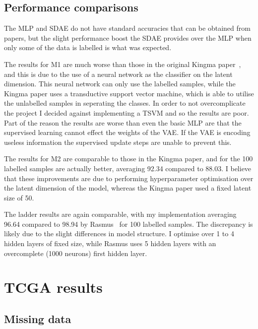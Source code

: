 \subsection{Performance comparisons}

The MLP and SDAE do not have standard accuracies that can be obtained from papers, but the slight performance boost the SDAE provides 
over the MLP when only some of the data is labelled is what was expected.

The results for M1 are much worse than those in the original Kingma paper~\cite{DBLP:journals/corr/KingmaRMW14}, and this is due to the use
of a neural network as the classifier on the latent dimension. This neural network can only use the labelled samples, while the Kingma 
paper uses a transductive support vector machine, which is able to utilise the unlabelled samples in seperating the classes. In order to
not overcomplicate the project I decided against implementing a TSVM and so the results are poor. Part of the reason the results are worse 
than even the basic MLP are that the supervised learning cannot effect the weights of the VAE. If the VAE is encoding useless information 
the supervised update steps are unable to prevent this.

The results for M2 are comparable to those in the Kingma paper, and for the 100 labelled samples are actually better, averaging 92.34 
compared to 88.03. I believe that these improvements are due to performing hyperparameter optimisation over the latent dimension of the 
model, whereas the Kingma paper used a fixed latent size of 50.

The ladder results are again comparable, with my implementation averaging 96.64 compared to 98.94 by Rasmus~\cite{DBLP:journals/corr/RasmusVHBR15}
for 100 labelled samples.
The discrepancy is likely due to the slight differences in model structure. I optimise over 1 to 4 hidden layers of fixed size,
while Rasmus uses 5 hidden layers with an overcomplete (1000 neurons) first hidden layer.

\section{TCGA results}

\subsection{Missing data}


